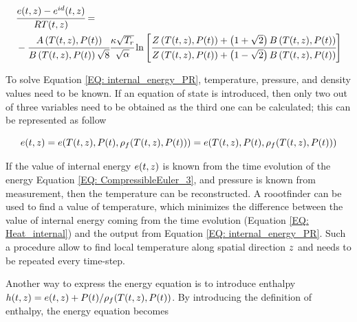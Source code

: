 \documentclass[../Article_Model_Parameters.tex]{subfiles}
\begin{document}
			{\scriptsize
				\begin{equation}
					\begin{aligned}
					&\cfrac{{\color{black}e}(t,z)-{\color{black}e}^{id}(t,z)}{R{\color{black}T}(t,z)} = \\
					& - \cfrac{{\color{black}A}\left({\color{black}T}(t,z), {\color{black}P}(t)\right)}{{\color{black}B}\left({\color{black}T}(t,z), {\color{black}P}(t)\right)\sqrt{8}} \cfrac{{\color{black}\kappa} \sqrt{\color{black}T_r}}{\sqrt{\alpha}} \ln \left[ \cfrac{{\color{black}Z}\left({\color{black}T}(t,z), {\color{black}P}(t)\right)+\left( 1+\sqrt{2} \right){\color{black}B}\left({\color{black}T}(t,z), {\color{black}P}(t)\right)}{{\color{black}Z}\left({\color{black}T}(t,z), {\color{black}P}(t)\right)+\left( 1-\sqrt{2} \right){\color{black}B}\left({\color{black}T}(t,z), {\color{black}P}(t)\right)} \right]
					\label{EQ: internal_energy_PR}
				\end{aligned}
			\end{equation}
			}
			
			To solve Equation \ref{EQ: internal_energy_PR}, temperature, pressure, and density values need to be known. If an equation of state is introduced, then only two out of three variables need to be obtained as the third one can be calculated; this can be represented as follow
			
			{\footnotesize
			\begin{equation}
				{\color{black}e}(t,z)={\color{black}e}({\color{black}T}(t,z),{\color{black}P}(t),{\color{black}\rho_f}({\color{black}T}(t,z),{\color{black}P}(t)))=e( {\color{black}T}(t,z),{\color{black}P}(t), {\color{black}\rho_f}({\color{black}T}(t,z),{\color{black}P}(t)) ) 
			\end{equation}
			}
		
			If the value of internal energy ${\color{black}e}(t,z)$ is known from the time evolution of the energy Equation \ref{EQ: CompressibleEuler_3}, and pressure is known from measurement, then the temperature can be reconstructed. A roootfinder can be used to find a value of temperature, which minimizes the difference between the value of internal energy coming from the time evolution (Equation \ref{EQ: Heat_internal}) and the output from Equation \ref{EQ: internal_energy_PR}. Such a procedure allow to find local temperature along spatial direction ${\color{black}z}$ and needs to be repeated every time-step.
			
			Another way to express the energy equation is to introduce enthalpy ${\color{black}h}(t,z) = {\color{black}e}(t,z) + {\color{black}P}(t) / {\color{black}\rho_f}({\color{black}T}(t,z),{\color{black}P}(t))$. By introducing the definition of enthalpy, the energy equation becomes
			
\end{document}
